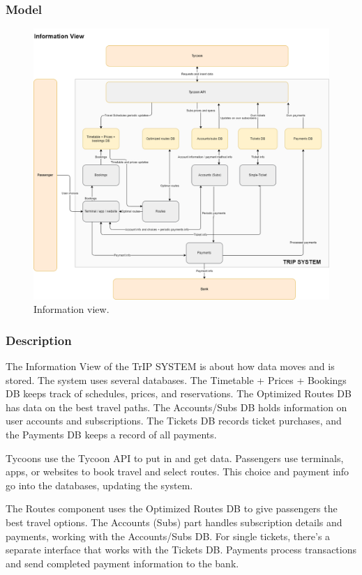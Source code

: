 \subsubsection{Model}
\begin{figure}[H]
    \centering
    \includegraphics[width=\textwidth]{drawings/views_final_version/information_view.png}
    \caption{Information view.}
    \label{fig:information_view}
\end{figure}

\subsubsection{Description}
The Information View of the TrIP SYSTEM is about how data moves and is stored. The system uses several databases. The Timetable + Prices + Bookings DB keeps track of schedules, prices, and reservations. The Optimized Routes DB has data on the best travel paths. The Accounts/Subs DB holds information on user accounts and subscriptions. The Tickets DB records ticket purchases, and the Payments DB keeps a record of all payments.

Tycoons use the Tycoon API to put in and get data. Passengers use terminals, apps, or websites to book travel and select routes. This choice and payment info go into the databases, updating the system.

The Routes component uses the Optimized Routes DB to give passengers the best travel options. The Accounts (Subs) part handles subscription details and payments, working with the Accounts/Subs DB. For single tickets, there's a separate interface that works with the Tickets DB. Payments process transactions and send completed payment information to the bank.

